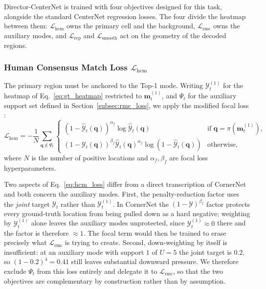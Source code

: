 \documentclass[preprint,12pt]{elsarticle}
\begin{document}
Director-CenterNet is trained with four objectives designed for this task,
alongside the standard CenterNet regression losses. The four divide the
heatmap between them: $\mathcal{L}_{\text{hcm}}$ owns the primary cell and the
background, $\mathcal{L}_{\text{rmc}}$ owns the auxiliary modes, and
$\mathcal{L}_{\text{rep}}$ and $\mathcal{L}_{\text{smooth}}$ act on the
geometry of the decoded regions.

\subsubsection{Human Consensus Match Loss $\mathcal{L}_{\text{hcm}}$}

The primary region must be anchored to the Top-1 mode. Writing
$\mathcal{Y}^{(1)}_t$ for the heatmap of Eq.~\ref{eq:gt_heatmap} restricted to
$\mathbf{m}^{(1)}_t$, and $\Psi_t$ for the auxiliary support set defined in
Section~\ref{subsec:rmc_loss}, we apply the modified focal loss
\cite{law2018cornernet}:
\begin{equation}
  \mathcal{L}_{\text{hcm}} = -\frac{1}{N}\sum_{\mathbf{q} \notin \Psi_t}
    \begin{cases}
      (1-\hat{\mathcal{Y}}_t(\mathbf{q}))^{\alpha_f}
        \log \hat{\mathcal{Y}}_t(\mathbf{q})
        & \text{if } \mathbf{q} = \pi(\mathbf{m}^{(1)}_t), \\[4pt]
      (1-\mathcal{Y}_t(\mathbf{q}))^{\beta_f}
        \hat{\mathcal{Y}}_t(\mathbf{q})^{\alpha_f}
        \log(1-\hat{\mathcal{Y}}_t(\mathbf{q}))
        & \text{otherwise,}
    \end{cases}
  \label{eq:hcm_loss}
\end{equation}
where $N$ is the number of positive locations and $\alpha_f, \beta_f$ are
focal loss hyperparameters.

Two aspects of Eq.~\ref{eq:hcm_loss} differ from a direct transcription of
CornerNet and both concern the auxiliary modes. First, the penalty-reduction
factor uses the \emph{joint} target $\mathcal{Y}_t$ rather than
$\mathcal{Y}^{(1)}_t$. In CornerNet the $(1-\mathcal{Y})^{\beta_f}$ factor
protects every ground-truth location from being pulled down as a hard
negative; weighting by $\mathcal{Y}^{(1)}_t$ alone leaves the auxiliary modes
unprotected, since $\mathcal{Y}^{(1)}_t \approx 0$ there and the factor is
therefore $\approx 1$. The focal term would then be trained to erase precisely
what $\mathcal{L}_{\text{rmc}}$ is trying to create. Second, down-weighting by
itself is insufficient: at an auxiliary mode with support $1$ of $U=5$ the
joint target is $0.2$, so $(1-0.2)^{4} = 0.41$ still leaves substantial
downward pressure. We therefore exclude $\Psi_t$ from this loss entirely and
delegate it to $\mathcal{L}_{\text{rmc}}$, so that the two objectives are
complementary by construction rather than by assumption.
\end{document}
